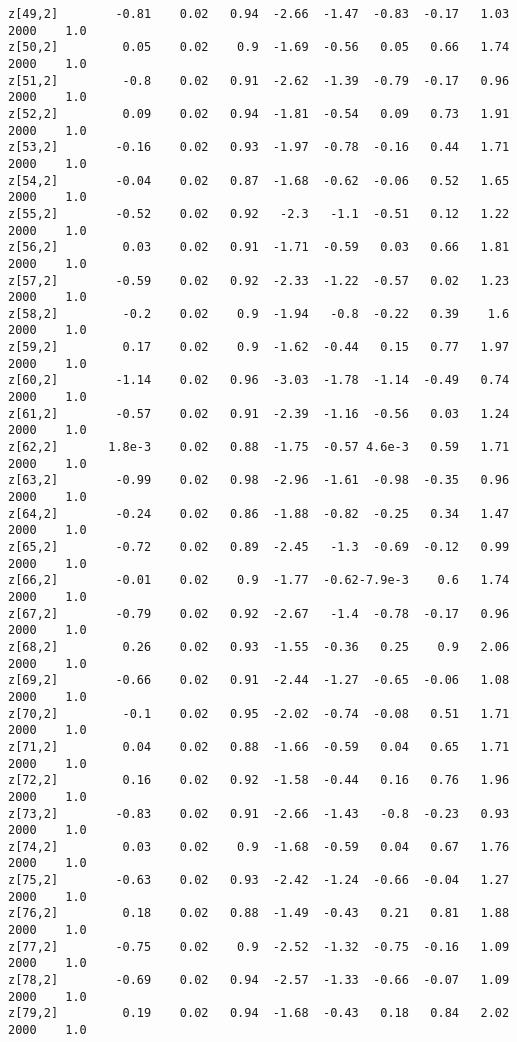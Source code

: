 \documentclass[11pt]{article}
\begin{document}
\begin{Verbatim}[commandchars=\\\{\}]
z[49,2]        -0.81    0.02   0.94  -2.66  -1.47  -0.83  -0.17   1.03   2000    1.0
z[50,2]         0.05    0.02    0.9  -1.69  -0.56   0.05   0.66   1.74   2000    1.0
z[51,2]         -0.8    0.02   0.91  -2.62  -1.39  -0.79  -0.17   0.96   2000    1.0
z[52,2]         0.09    0.02   0.94  -1.81  -0.54   0.09   0.73   1.91   2000    1.0
z[53,2]        -0.16    0.02   0.93  -1.97  -0.78  -0.16   0.44   1.71   2000    1.0
z[54,2]        -0.04    0.02   0.87  -1.68  -0.62  -0.06   0.52   1.65   2000    1.0
z[55,2]        -0.52    0.02   0.92   -2.3   -1.1  -0.51   0.12   1.22   2000    1.0
z[56,2]         0.03    0.02   0.91  -1.71  -0.59   0.03   0.66   1.81   2000    1.0
z[57,2]        -0.59    0.02   0.92  -2.33  -1.22  -0.57   0.02   1.23   2000    1.0
z[58,2]         -0.2    0.02    0.9  -1.94   -0.8  -0.22   0.39    1.6   2000    1.0
z[59,2]         0.17    0.02    0.9  -1.62  -0.44   0.15   0.77   1.97   2000    1.0
z[60,2]        -1.14    0.02   0.96  -3.03  -1.78  -1.14  -0.49   0.74   2000    1.0
z[61,2]        -0.57    0.02   0.91  -2.39  -1.16  -0.56   0.03   1.24   2000    1.0
z[62,2]       1.8e-3    0.02   0.88  -1.75  -0.57 4.6e-3   0.59   1.71   2000    1.0
z[63,2]        -0.99    0.02   0.98  -2.96  -1.61  -0.98  -0.35   0.96   2000    1.0
z[64,2]        -0.24    0.02   0.86  -1.88  -0.82  -0.25   0.34   1.47   2000    1.0
z[65,2]        -0.72    0.02   0.89  -2.45   -1.3  -0.69  -0.12   0.99   2000    1.0
z[66,2]        -0.01    0.02    0.9  -1.77  -0.62-7.9e-3    0.6   1.74   2000    1.0
z[67,2]        -0.79    0.02   0.92  -2.67   -1.4  -0.78  -0.17   0.96   2000    1.0
z[68,2]         0.26    0.02   0.93  -1.55  -0.36   0.25    0.9   2.06   2000    1.0
z[69,2]        -0.66    0.02   0.91  -2.44  -1.27  -0.65  -0.06   1.08   2000    1.0
z[70,2]         -0.1    0.02   0.95  -2.02  -0.74  -0.08   0.51   1.71   2000    1.0
z[71,2]         0.04    0.02   0.88  -1.66  -0.59   0.04   0.65   1.71   2000    1.0
z[72,2]         0.16    0.02   0.92  -1.58  -0.44   0.16   0.76   1.96   2000    1.0
z[73,2]        -0.83    0.02   0.91  -2.66  -1.43   -0.8  -0.23   0.93   2000    1.0
z[74,2]         0.03    0.02    0.9  -1.68  -0.59   0.04   0.67   1.76   2000    1.0
z[75,2]        -0.63    0.02   0.93  -2.42  -1.24  -0.66  -0.04   1.27   2000    1.0
z[76,2]         0.18    0.02   0.88  -1.49  -0.43   0.21   0.81   1.88   2000    1.0
z[77,2]        -0.75    0.02    0.9  -2.52  -1.32  -0.75  -0.16   1.09   2000    1.0
z[78,2]        -0.69    0.02   0.94  -2.57  -1.33  -0.66  -0.07   1.09   2000    1.0
z[79,2]         0.19    0.02   0.94  -1.68  -0.43   0.18   0.84   2.02   2000    1.0

\end{Verbatim}
\end{document}

